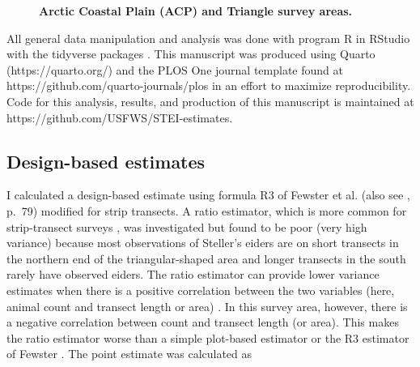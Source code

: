 \documentclass[
  10pt,
  letterpaper,
]{article}
\begin{document}
\begin{figure}

\caption{\label{fig-area}\textbf{Arctic Coastal Plain (ACP) and Triangle survey areas.} }

\end{figure}%

All general data manipulation and analysis was done with program R
\citep{r-base} in RStudio \citep{RStudio2024} with the tidyverse
packages \citep{tidyverse}. This manuscript was produced using Quarto
(https://quarto.org/) and the PLOS One journal template found at
https://github.com/quarto-journals/plos in an effort to maximize
reproducibility. Code for this analysis, results, and production of this
manuscript is maintained at https://github.com/USFWS/STEI-estimates.

\subsection{Design-based estimates}\label{design-based-estimates}

I calculated a design-based estimate using formula R3 of Fewster et
al. \citep{fewster2009} (also see \citep{buckland2001}, p.~79)
modified for strip transects. A ratio estimator, which is more common
for strip-transect surveys \citep{cochran1977, williams2002, thompson2012}, was investigated but found to be poor (very high variance) because most observations of Steller's eiders are on short transects in the northern end of the triangular-shaped area and longer transects in the south rarely have observed eiders. The ratio estimator can provide lower variance estimates when there is a positive correlation between the two variables (here, animal count and transect length or area) \citep{cochran1977, thompson2012}. In this survey area, however, there is a negative correlation between count and transect length (or area). This makes the ratio estimator worse than a simple plot-based estimator or the R3 estimator of Fewster \citep{fewster2009}. The point estimate was calculated as
\end{document}
